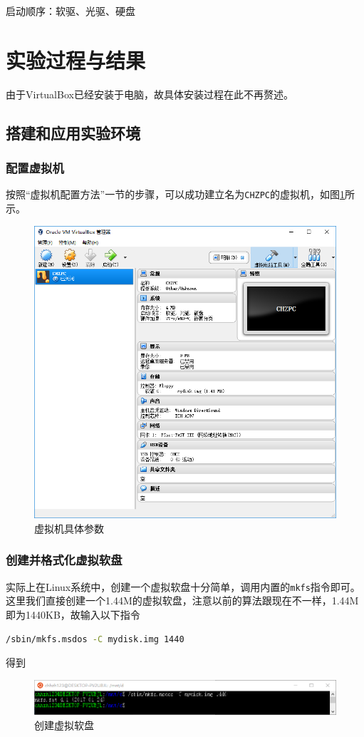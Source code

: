 \documentclass[logo,reportComp]{thesis}
\begin{document}
启动顺序：软驱、光驱、硬盘

\section{实验过程与结果}
由于VirtualBox已经安装于电脑，故具体安装过程在此不再赘述。

\subsection{搭建和应用实验环境}
\subsubsection{配置虚拟机}
按照``虚拟机配置方法''一节的步骤，可以成功建立名为\verb'CHZPC'的虚拟机，如图\ref{fig:virtual_machine_configuration}所示。
\begin{figure}[H]
\centering
\includegraphics[width=0.6\linewidth]{fig/virtual_machine_configuration.PNG}
\caption{虚拟机具体参数}
\label{fig:virtual_machine_configuration}
\end{figure}

\subsubsection{创建并格式化虚拟软盘}
实际上在Linux系统中，创建一个虚拟软盘十分简单，调用内置的\verb'mkfs'指令即可。
这里我们直接创建一个1.44M的虚拟软盘，注意以前的算法跟现在不一样，1.44M即为1440KB，故输入以下指令
\begin{lstlisting}[language=bash]
/sbin/mkfs.msdos -C mydisk.img 1440
\end{lstlisting}
得到
\begin{figure}[H]
\centering
\includegraphics[width=0.8\linewidth]{fig/create_disk.PNG}
\caption{创建虚拟软盘}
\label{fig:create_disk}
\end{figure}
\end{document}
